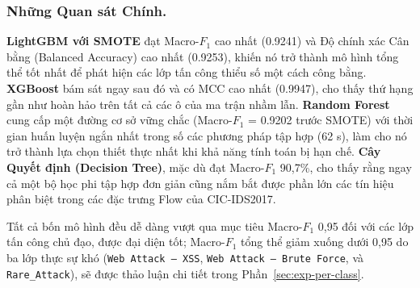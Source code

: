\subsubsection*{Những Quan sát Chính.}
\textbf{LightGBM với SMOTE} đạt Macro-$F_1$ cao nhất (0.9241) và Độ chính xác Cân bằng (Balanced Accuracy) cao nhất (0.9253), khiến nó trở thành mô hình tổng thể tốt nhất để phát hiện các lớp tấn công thiểu số một cách công bằng.
\textbf{XGBoost} bám sát ngay sau đó và có MCC cao nhất (0.9947), cho thấy thứ hạng gần như hoàn hảo trên tất cả các ô của ma trận nhầm lẫn.
\textbf{Random Forest} cung cấp một đường cơ sở vững chắc (Macro-$F_1$ = 0.9202 trước SMOTE) với thời gian huấn luyện ngắn nhất trong số các phương pháp tập hợp (62 s), làm cho nó trở thành lựa chọn thiết thực nhất khi khả năng tính toán bị hạn chế.
\textbf{Cây Quyết định (Decision Tree)}, mặc dù đạt Macro-$F_1$ 90,7\%, cho thấy rằng ngay cả một bộ học phi tập hợp đơn giản cũng nắm bắt được phần lớn các tín hiệu phân biệt trong các đặc trưng Flow của CIC-IDS2017.

Tất cả bốn mô hình đều dễ dàng vượt qua mục tiêu Macro-$F_1$ 0,95 đối với các lớp tấn công chủ đạo, được đại diện tốt; Macro-$F_1$ tổng thể giảm xuống dưới 0,95 do ba lớp thực sự khó (\texttt{Web Attack -- XSS}, \texttt{Web Attack -- Brute Force}, và \texttt{Rare\_Attack}), sẽ được thảo luận chi tiết trong Phần~\ref{sec:exp-per-class}.
